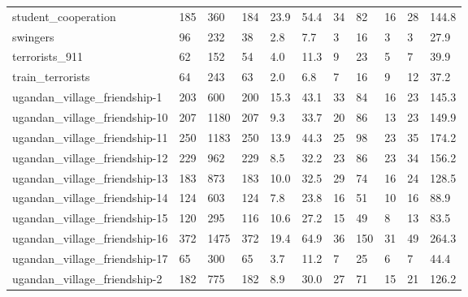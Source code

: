 \begin{longtable}{lllllllllll}
 student\_cooperation                                & 185        & 360       & 184   & 23.9   & 54.4   & 34    & 82     & 16     & 28     & 144.8   \\
 swingers                                           & 96         & 232       & 38    & 2.8    & 7.7    & 3     & 16     & 3      & 3      & 27.9    \\
 terrorists\_911                                     & 62         & 152       & 54    & 4.0    & 11.3   & 9     & 23     & 5      & 7      & 39.9    \\
 train\_terrorists                                   & 64         & 243       & 63    & 2.0    & 6.8    & 7     & 16     & 9      & 12     & 37.2    \\
 ugandan\_village\_friendship-1                       & 203        & 600       & 200   & 15.3   & 43.1   & 33    & 84     & 16     & 23     & 145.3   \\
 ugandan\_village\_friendship-10                      & 207        & 1180      & 207   & 9.3    & 33.7   & 20    & 86     & 13     & 23     & 149.9   \\
 ugandan\_village\_friendship-11                      & 250        & 1183      & 250   & 13.9   & 44.3   & 25    & 98     & 23     & 35     & 174.2   \\
 ugandan\_village\_friendship-12                      & 229        & 962       & 229   & 8.5    & 32.2   & 23    & 86     & 23     & 34     & 156.2   \\
 ugandan\_village\_friendship-13                      & 183        & 873       & 183   & 10.0   & 32.5   & 29    & 74     & 16     & 24     & 128.5   \\
 ugandan\_village\_friendship-14                      & 124        & 603       & 124   & 7.8    & 23.8   & 16    & 51     & 10     & 16     & 88.9    \\
 ugandan\_village\_friendship-15                      & 120        & 295       & 116   & 10.6   & 27.2   & 15    & 49     & 8      & 13     & 83.5    \\
 ugandan\_village\_friendship-16                      & 372        & 1475      & 372   & 19.4   & 64.9   & 36    & 150    & 31     & 49     & 264.3   \\
 ugandan\_village\_friendship-17                      & 65         & 300       & 65    & 3.7    & 11.2   & 7     & 25     & 6      & 7      & 44.4    \\
 ugandan\_village\_friendship-2                       & 182        & 775       & 182   & 8.9    & 30.0   & 27    & 71     & 15     & 21     & 126.2   \\

\end{longtable}
